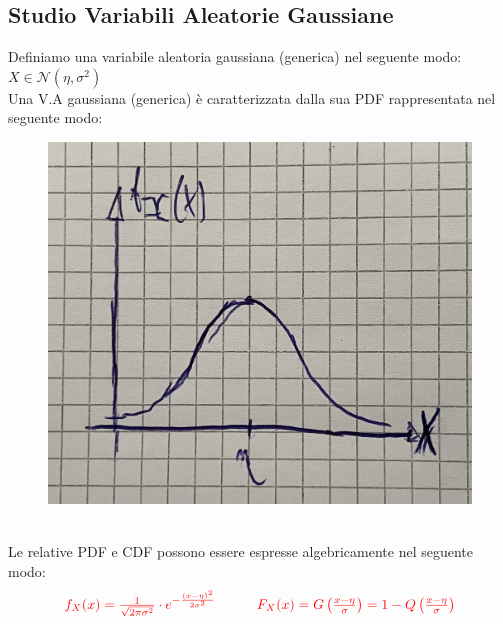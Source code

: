 \documentclass{article}
\begin{document}
\subsection{Studio Variabili Aleatorie Gaussiane}
Definiamo una variabile aleatoria gaussiana (generica) nel seguente modo: $X \in \mathcal{N}(\eta,\sigma^2)$ \\
Una V.A gaussiana (generica) è caratterizzata dalla sua PDF rappresentata nel seguente modo:
\begin{figure}[ht]
\centering
\includegraphics[scale=0.12]{images/62.V.A.GaussGen.jpeg}
\end{figure} ~\\
Le relative PDF e CDF possono essere espresse algebricamente nel seguente modo:
\[\color{red}
\begin{matrix}
f_X(x) = \frac{1}{\sqrt{2 \pi \sigma^2}} \cdot e^{-\frac{\left( x - \eta \right)^2}{2\sigma^2}} 
&&&
F_X(x) = G \left(\frac{x-\eta}{\sigma}\right) = 1 - Q \left(\frac{x-\eta}{\sigma}\right)
\end{matrix}\]
\end{document}
